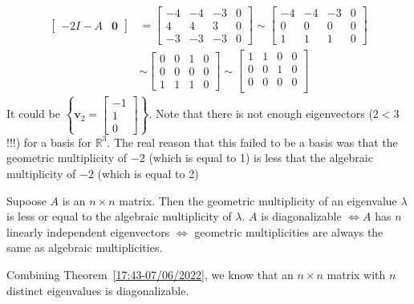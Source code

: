 \documentclass{beamer}
\theoremstyle{definition}
\theoremstyle{remark}
\begin{document}
\begin{frame}[t]
\begin{example}
\begin{align*}
\left[\begin{array}{c|c}
-2I-A&\mathbf0
\end{array}\right]&=\left[\begin{array}{ccc|c}
-4&-4&-3&0\\
4&4&3&0\\
-3&-3&-3&0
\end{array}\right]\sim\left[\begin{array}{ccc|c}
-4&-4&-3&0\\
0&0&0&0\\
1&1&1&0
\end{array}\right]\\
&\sim\left[\begin{array}{ccc|c}
0&0&1&0\\
0&0&0&0\\
1&1&1&0
\end{array}\right]\sim\left[\begin{array}{ccc|c}
1&1&0&0\\
0&0&1&0\\
0&0&0&0\\
\end{array}\right]
\end{align*}
It could be $\left\{\mathbf v_2=\begin{bmatrix}
-1\\1\\0
\end{bmatrix}\right\}$\pause. Note that there is not enough eigenvectors ($2<3$!!!) for a basis for $\mathbb R^3$. The real reason that this failed to be a basis was that the geometric multiplicity of $-2$ (which is equal to 1) is less that the algebraic multiplicity of $-2$ (which is equal to 2)
\end{example}
\end{frame}

\begin{frame}[t]
\begin{theorem}
Supoose $A$ is an $n\times n$ matrix. Then the geometric multiplicity of an eigenvalue $\lambda$ is less or equal to the algebraic multiplicity of $\lambda$. $A$ is diagonalizable $\iff A$ has $n$ linearly independent eigenvectors $\iff$ geometric multiplicities are always the same as algebraic multiplicities.
\end{theorem}
\pause
\begin{theorem}\label{13:41-07/08/2022}
Combining Theorem~\ref{17:43-07/06/2022}, we know that an $n\times n$ matrix with $n$ distinct eigenvalues is diagonalizable.
\end{theorem}
\end{frame}
\end{document}
